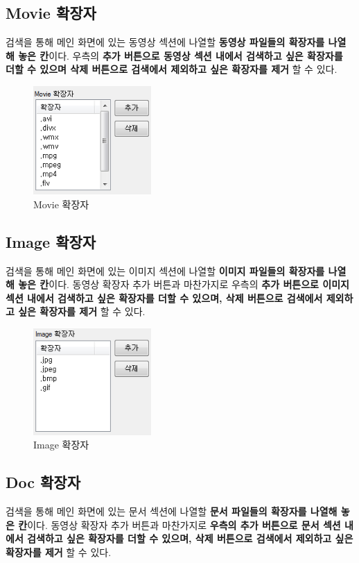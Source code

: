 \documentclass[a4paper, 13pt]{article} %
\begin{document}
	\subsection{Movie 확장자}
	검색을 통해 메인 화면에 있는 동영상 섹션에 나열할 \textbf{동영상 파일들의 확장자를 나열해 놓은 칸}이다.
	우측의 \textbf{추가 버튼으로 동영상 섹션 내에서 검색하고 싶은 확장자를 더할 수 있으며 삭제 버튼으로 검색에서 제외하고 싶은 확장자를 제거} 할 수 있다.
	
	\begin{figure}[h]
		\centering
		\includegraphics[width=0.4\textwidth]{Figures/Movie}
		\caption{Movie 확장자}
		\label{fig:movie}
	\end{figure}

	\subsection{Image 확장자}
	검색을 통해 메인 화면에 있는 이미지 섹션에 나열할 \textbf{이미지 파일들의 확장자를 나열해 놓은 칸}이다. 동영상 확장자 추가 버튼과 마찬가지로 우측의 \textbf{추가 버튼으로 이미지 섹션 내에서 검색하고 싶은 확장자를 더할 수 있으며, 삭제 버튼으로 검색에서 제외하고 싶은 확장자를 제거} 할 수 있다.
	
	\begin{figure}[h]
		\centering
		\includegraphics[width=0.4\textwidth]{Figures/Image}
		\caption{Image 확장자}
		\label{fig:image}
	\end{figure}
	
	\subsection{Doc 확장자}		
	검색을 통해 메인 화면에 있는 문서 섹션에 나열할 \textbf{문서 파일들의 확장자를 나열해 놓은 칸}이다. 동영상 확장자 추가 버튼과 마찬가지로 \textbf{우측의 추가 버튼으로 문서 섹션 내에서 검색하고 싶은 확장자를 더할 수 있으며, 삭제 버튼으로 검색에서 제외하고 싶은 확장자를 제거} 할 수 있다.
	
\end{document}

